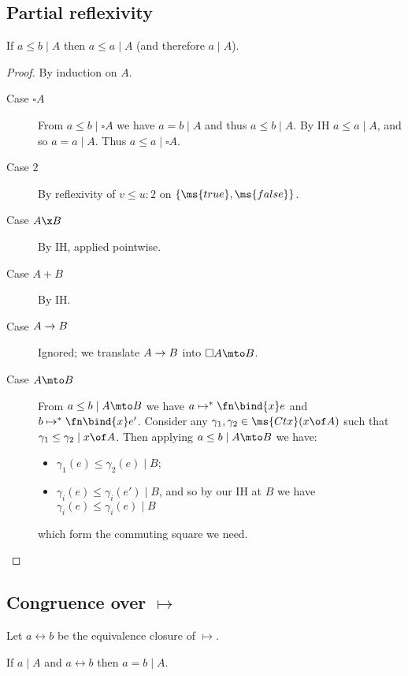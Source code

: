 \documentclass{article}
\newcommand{\step}{\mapsto}
\newcommand{\steps}{\step^*}
\newcommand{\betaeq}{\leftrightarrow}
\newcommand{\lr}[2]{#2\mathrel{|}#1}
\newcommand{\disc}[1]{\square{#1}}
\begin{document}

\subsection{Partial reflexivity}
\begin{theorem}
  If $\lr{A}{a \le b}$ then $\lr{A}{a \le a}$ (and therefore $\lr{A}{a}$).
\end{theorem}

\begin{proof}
  By induction on $A$.
  \begin{description}
  \item[Case $\disc{A}$] From $\lr{\disc{A}}{a \le b}$ we have $\lr{A}{a = b}$
    and thus $\lr{A}{a \le b}$. By IH $\lr{A}{a \le a}$, and so $\lr{A}{a = a}$.
    Thus $\lr{\disc{A}}{a \le a}$.
  \item[Case $2$] By reflexivity of $v \le u : 2$ on $\{\ms{true},\ms{false}\}$.
  \item[Case $A \x B$] By IH, applied pointwise. 
  \item[Case $A + B$] By IH. 
  \item[Case $A \to B$] Ignored; we translate $A \to B$ into $\disc{A} \mto B$.
  \item[Case $A \mto B$] From $\lr{A \mto B}{a \le b}$ we have $a \steps
    \fn\bind{x} e$ and $b \steps \fn\bind{x} e'$. Consider any $\gamma_1,
    \gamma_2 \in \ms{Ctx}(x \of A)$ such that $\lr{x\of A}{\gamma_1 \le
      \gamma_2}$. Then applying $\lr{A \mto B}{a \le b}$ we have:
    \begin{itemize}
    \item $\lr{B}{\gamma_1(e) \le \gamma_2(e)}$;
    \item $\lr{B}{\gamma_i(e) \le \gamma_i(e')}$, and so by our IH at $B$ we
      have $\lr{B}{\gamma_i(e) \le \gamma_i(e)}$
    \end{itemize}
    which form the commuting square we need.

  \end{description}
\end{proof}


\subsection{Congruence over $\step$}

Let $a \betaeq b$ be the equivalence closure of $\step$.

\begin{theorem}
  If $\lr{A}{a}$ and $a \betaeq b$ then $\lr{A}{a = b}$.
\end{theorem}
\end{document}
